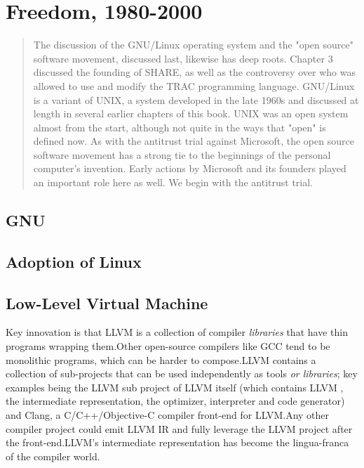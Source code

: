 \chapter{Freedom, 1980-2000}



\begin{quotation}
The discussion of the GNU/Linux 
operating system and the "open source" software movement, discussed last, 
likewise has deep roots. Chapter 3 discussed the founding of SHARE, as well as 
the controversy over who was allowed to use and modify the TRAC programming 
language. GNU/Linux is a variant of UNIX, a system developed in the late 1960s 
and discussed at length in several earlier chapters of this book. UNIX was an 
open system almost from the start, although not quite in the ways that "open" is 
defined now. As with the antitrust trial against Microsoft, the open source 
software movement has a strong tie to the beginnings of the personal computer's 
invention. Early actions by Microsoft and its founders played an important role 
here as well. We begin with the 
antitrust trial.\cite{history_of_modern_computing_2003_ceruzzi}
\end{quotation}

\section{GNU}

\section{Adoption of Linux}

\section{Low-Level Virtual Machine}

Key innovation is that LLVM is a collection of compiler \textit{libraries} that 
have thin programs wrapping them.Other open-source compilers like GCC tend to be 
monolithic programs, which can be harder to compose.LLVM contains a collection 
of sub-projects that can be used independently as tools \textit{or libraries}; 
key examples being the LLVM sub project of LLVM itself (which contains LLVM , 
the intermediate representation, the optimizer, interpreter and code 
generator) and Clang, a C/C++/Objective-C compiler front-end for LLVM.Any other 
compiler project could emit LLVM IR and fully leverage the LLVM project after 
the front-end.LLVM's intermediate representation has become the lingua-franca 
of the compiler world.

